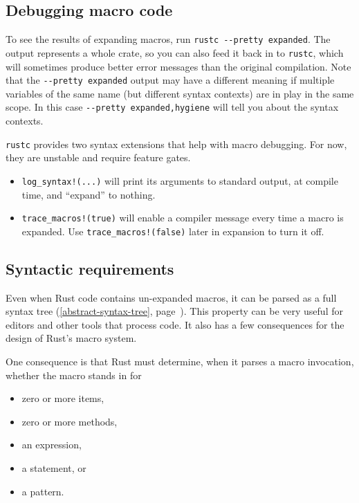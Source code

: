 \documentclass[a4paper,]{book}
\renewcommand*{\hypertarget}[3][\ar]{%
  \def\ar{#2}%
  \label{#1}%
  #3}
\renewcommand*{\hyperlink}[2]{%
 #2 (\autoref{#1}, page~\pageref{#1})}
\providecommand{\tightlist}{%
  \setlength{\itemsep}{0pt}\setlength{\parskip}{0pt}}
\begin{document}
\hypertarget{debugging-macro-code}{\subsection{Debugging macro
code}\label{debugging-macro-code}}

To see the results of expanding macros, run
\texttt{rustc\ -\/-pretty\ expanded}. The output represents a whole
crate, so you can also feed it back in to \texttt{rustc}, which will
sometimes produce better error messages than the original compilation.
Note that the \texttt{-\/-pretty\ expanded} output may have a different
meaning if multiple variables of the same name (but different syntax
contexts) are in play in the same scope. In this case
\texttt{-\/-pretty\ expanded,hygiene} will tell you about the syntax
contexts.

\texttt{rustc} provides two syntax extensions that help with macro
debugging. For now, they are unstable and require feature gates.

\begin{itemize}
\item
  \texttt{log\_syntax!(...)} will print its arguments to standard
  output, at compile time, and ``expand'' to nothing.
\item
  \texttt{trace\_macros!(true)} will enable a compiler message every
  time a macro is expanded. Use \texttt{trace\_macros!(false)} later in
  expansion to turn it off.
\end{itemize}

\subsection{Syntactic requirements}\label{syntactic-requirements}

Even when Rust code contains un-expanded macros, it can be parsed as a
full \protect\hyperlink{abstract-syntax-tree}{syntax tree}. This
property can be very useful for editors and other tools that process
code. It also has a few consequences for the design of Rust's macro
system.

One consequence is that Rust must determine, when it parses a macro
invocation, whether the macro stands in for

\begin{itemize}
\tightlist
\item
  zero or more items,
\item
  zero or more methods,
\item
  an expression,
\item
  a statement, or
\item
  a pattern.
\end{itemize}
\end{document}
